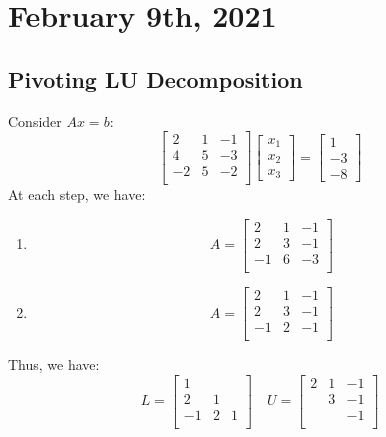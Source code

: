 \documentclass[../main/main.tex]{subfiles}
\begin{document}
\section{February 9th, 2021}
\subsection{Pivoting LU Decomposition}
\begin{example}
  Consider $Ax = b$: \[
    \begin{bmatrix}
      2&1&-1 \\
      4&5&-3\\
      -2&5&-2\\
    \end{bmatrix}
    \begin{bmatrix}
      x_1\\ x_2\\ x_3
    \end{bmatrix}
    = \begin{bmatrix}
1\\-3\\-8
    \end{bmatrix}
  \] At each step, we have:
  \begin{enumerate}
    \item \[
          A=
    \begin{bmatrix}
      2&1&-1 \\
      2&3&-1\\
      -1&6&-3\\
    \end{bmatrix}
          \]
    \item \[
          A=
    \begin{bmatrix}
      2&1&-1 \\
      2&3&-1\\
      -1&2&-1\\
    \end{bmatrix}
          \]
  \end{enumerate}
  Thus, we have: \[
L =
    \begin{bmatrix}
      1&& \\
      2&1&\\
      -1&2&1\\
    \end{bmatrix}
     \quad U =
    \begin{bmatrix}
      2&1&-1 \\
      &3&-1\\
      &&-1\\
    \end{bmatrix}
\]
\end{example}
\end{document}
